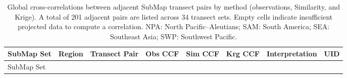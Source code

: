 \documentclass[final]{agujournal2019}
\begin{document}
\clearpage

\begin{longtable}[]{@{}
  >{\raggedright\arraybackslash}p{}
  >{\raggedleft\arraybackslash}p{}
  >{\raggedleft\arraybackslash}p{}
  >{\raggedleft\arraybackslash}p{}
  >{\raggedleft\arraybackslash}p{}
  >{\raggedleft\arraybackslash}p{}
  >{\raggedleft\arraybackslash}p{}
  >{\raggedleft\arraybackslash}p{}@{}}
\caption{Global cross-correlations between adjacent SubMap transect
pairs by method (observations, Similarity, and Krige). A total of 201
adjacent pairs are listed across 34 transect sets. Empty cells indicate
insufficient projected data to compute a correlation. NPA: North
Pacific--Aleutians; SAM: South America; SEA: Southeast Asia; SWP:
Southwest Pacific.}\label{tbl:global-ccf-summary}\tabularnewline
\toprule\noalign{}
\begin{minipage}[b]{\linewidth}\raggedright
SubMap Set
\end{minipage} & \begin{minipage}[b]{\linewidth}\raggedleft
Region
\end{minipage} & \begin{minipage}[b]{\linewidth}\raggedleft
Transect Pair
\end{minipage} & \begin{minipage}[b]{\linewidth}\raggedleft
Obs CCF
\end{minipage} & \begin{minipage}[b]{\linewidth}\raggedleft
Sim CCF
\end{minipage} & \begin{minipage}[b]{\linewidth}\raggedleft
Krg CCF
\end{minipage} & \begin{minipage}[b]{\linewidth}\raggedleft
Interpretation
\end{minipage} & \begin{minipage}[b]{\linewidth}\raggedleft
UID
\end{minipage} \\
\midrule\noalign{}
\endfirsthead
\toprule\noalign{}
\begin{minipage}[b]{\linewidth}\raggedright
SubMap Set
\end{minipage} & \begin{minipage}[b]{\linewidth}\raggedleft

\end{minipage}
\end{longtable}
\end{document}
